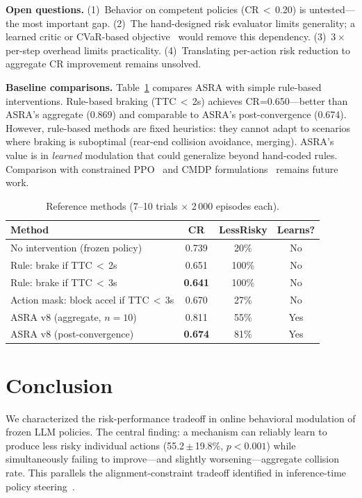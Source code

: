 \documentclass[runningheads]{llncs}
\begin{document}
\textbf{Open questions.} (1)~Behavior on competent policies (CR\,$<$\,0.20) is untested---the most important gap. (2)~The hand-designed risk evaluator limits generality; a learned critic or CVaR-based objective~\cite{cvar_cpo2024} would remove this dependency. (3)~$3\times$ per-step overhead limits practicality. (4)~Translating per-action risk reduction to aggregate CR improvement remains unsolved.

\textbf{Baseline comparisons.} Table~\ref{tab:baselines} compares ASRA with simple rule-based interventions. Rule-based braking (TTC\,$<$\,2s) achieves CR=0.650---better than ASRA's aggregate (0.869) and comparable to ASRA's post-convergence (0.674). However, rule-based methods are fixed heuristics: they cannot adapt to scenarios where braking is suboptimal (rear-end collision avoidance, merging). ASRA's value is in \emph{learned} modulation that could generalize beyond hand-coded rules. Comparison with constrained PPO~\cite{schulman2017ppo} and CMDP formulations~\cite{saferl_survey2025} remains future work.

\begin{table}[H]
\centering
\caption{Reference methods (7--10 trials $\times$ 2\,000 episodes each).}
\label{tab:baselines}
\begin{tabular}{lccc}
\toprule
Method & CR & LessRisky & Learns? \\
\midrule
No intervention (frozen policy) & 0.739 & 20\% & No \\
Rule: brake if TTC\,$<$\,2s & 0.651 & 100\% & No \\
Rule: brake if TTC\,$<$\,3s & \textbf{0.641} & 100\% & No \\
Action mask: block accel if TTC\,$<$\,3s & 0.670 & 27\% & No \\
\midrule
ASRA v8 (aggregate, $n{=}10$) & 0.811 & 55\% & Yes \\
ASRA v8 (post-convergence) & \textbf{0.674} & 81\% & Yes \\
\bottomrule
\end{tabular}
\end{table}

\FloatBarrier
\section{Conclusion}
\label{sec:conclusion}

We characterized the risk-performance tradeoff in online behavioral modulation of frozen LLM policies. The central finding: a mechanism can reliably learn to produce less risky individual actions (55.2\,$\pm$\,19.8\%, $p{<}0.001$) while simultaneously failing to improve---and slightly worsening---aggregate collision rate. This parallels the alignment-constraint tradeoff identified in inference-time policy steering~\cite{itps2025}.
\end{document}
